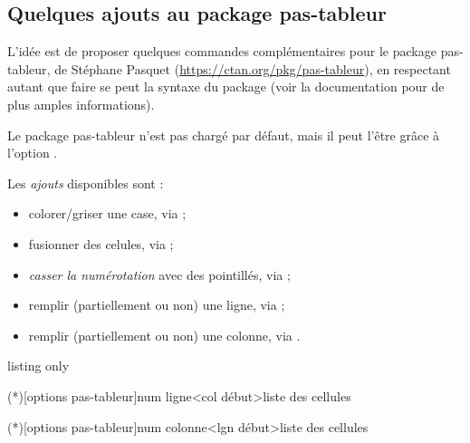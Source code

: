 \documentclass[french,11pt,a4paper]{article}
\begin{document}
\subsection{Quelques ajouts au package pas-tableur}

L'idée est de proposer quelques commandes complémentaires pour le package \textsf{pas-tableur}, de Stéphane Pasquet (\url{https://ctan.org/pkg/pas-tableur}), en respectant autant que faire se peut la syntaxe du package (voir la documentation pour de plus amples informations).

\smallskip

Le package \textsf{pas-tableur} n'est pas chargé par défaut, mais il peut l'être grâce à l'option \MontreCode{[pastableur]}.

\smallskip

Les \textit{ajouts} disponibles sont :

\begin{itemize}
	\item colorer/griser une case, via  ;
	\item fusionner des celules, via  ;
	\item \textit{casser la numérotation} avec des pointillés, via  ;
	\item remplir (partiellement ou non) une ligne,  via  ;
	\item remplir (partiellement ou non) une colonne,  via .
\end{itemize}

\begin{DemoCode}{listing only}
\usepackage[pastableur]{customenvs}




\lignetxt(*)[options pas-tableur]{num ligne}<col début>{liste des cellules}

\colonnetxt(*)[options pas-tableur]{num colonne}<lgn début>{liste des cellules}
\end{DemoCode}

\pagebreak
\end{document}
